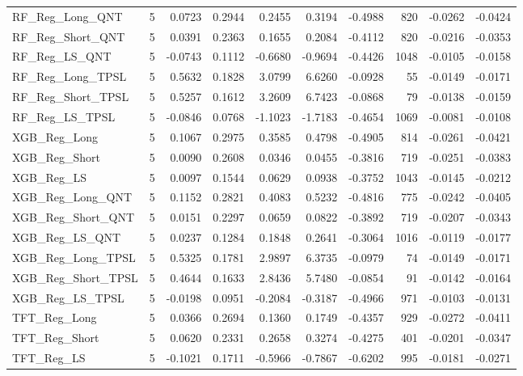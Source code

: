 \begin{tabular}{llrrrrrrrr}
\cline{1-10}
RF\_Reg\_Long\_QNT & 5 & 0.0723 & 0.2944 & 0.2455 & 0.3194 & -0.4988 & 820 & -0.0262 & -0.0424 \\
\cline{1-10}
RF\_Reg\_Short\_QNT & 5 & 0.0391 & 0.2363 & 0.1655 & 0.2084 & -0.4112 & 820 & -0.0216 & -0.0353 \\
\cline{1-10}
RF\_Reg\_LS\_QNT & 5 & -0.0743 & 0.1112 & -0.6680 & -0.9694 & -0.4426 & 1048 & -0.0105 & -0.0158 \\
\cline{1-10}
RF\_Reg\_Long\_TPSL & 5 & 0.5632 & 0.1828 & 3.0799 & 6.6260 & -0.0928 & 55 & -0.0149 & -0.0171 \\
\cline{1-10}
RF\_Reg\_Short\_TPSL & 5 & 0.5257 & 0.1612 & 3.2609 & 6.7423 & -0.0868 & 79 & -0.0138 & -0.0159 \\
\cline{1-10}
RF\_Reg\_LS\_TPSL & 5 & -0.0846 & 0.0768 & -1.1023 & -1.7183 & -0.4654 & 1069 & -0.0081 & -0.0108 \\
\cline{1-10}
XGB\_Reg\_Long & 5 & 0.1067 & 0.2975 & 0.3585 & 0.4798 & -0.4905 & 814 & -0.0261 & -0.0421 \\
\cline{1-10}
XGB\_Reg\_Short & 5 & 0.0090 & 0.2608 & 0.0346 & 0.0455 & -0.3816 & 719 & -0.0251 & -0.0383 \\
\cline{1-10}
XGB\_Reg\_LS & 5 & 0.0097 & 0.1544 & 0.0629 & 0.0938 & -0.3752 & 1043 & -0.0145 & -0.0212 \\
\cline{1-10}
XGB\_Reg\_Long\_QNT & 5 & 0.1152 & 0.2821 & 0.4083 & 0.5232 & -0.4816 & 775 & -0.0242 & -0.0405 \\
\cline{1-10}
XGB\_Reg\_Short\_QNT & 5 & 0.0151 & 0.2297 & 0.0659 & 0.0822 & -0.3892 & 719 & -0.0207 & -0.0343 \\
\cline{1-10}
XGB\_Reg\_LS\_QNT & 5 & 0.0237 & 0.1284 & 0.1848 & 0.2641 & -0.3064 & 1016 & -0.0119 & -0.0177 \\
\cline{1-10}
XGB\_Reg\_Long\_TPSL & 5 & 0.5325 & 0.1781 & 2.9897 & 6.3735 & -0.0979 & 74 & -0.0149 & -0.0171 \\
\cline{1-10}
XGB\_Reg\_Short\_TPSL & 5 & 0.4644 & 0.1633 & 2.8436 & 5.7480 & -0.0854 & 91 & -0.0142 & -0.0164 \\
\cline{1-10}
XGB\_Reg\_LS\_TPSL & 5 & -0.0198 & 0.0951 & -0.2084 & -0.3187 & -0.4966 & 971 & -0.0103 & -0.0131 \\
\cline{1-10}
TFT\_Reg\_Long & 5 & 0.0366 & 0.2694 & 0.1360 & 0.1749 & -0.4357 & 929 & -0.0272 & -0.0411 \\
\cline{1-10}
TFT\_Reg\_Short & 5 & 0.0620 & 0.2331 & 0.2658 & 0.3274 & -0.4275 & 401 & -0.0201 & -0.0347 \\
\cline{1-10}
TFT\_Reg\_LS & 5 & -0.1021 & 0.1711 & -0.5966 & -0.7867 & -0.6202 & 995 & -0.0181 & -0.0271 \\

\end{tabular}
